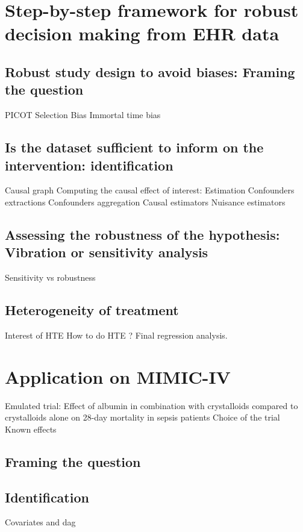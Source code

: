 \documentclass{report}
\begin{document}
\section{Step-by-step framework for robust decision making from EHR data}\label{sec:causal_tuto:framework}

\subsection{Robust study design to avoid biases: Framing the question}
PICOT
Selection Bias
Immortal time bias

\subsection{Is the dataset sufficient to inform on the intervention: identification}
Causal graph Computing the causal effect of interest: Estimation Confounders
extractions Confounders aggregation Causal estimators Nuisance estimators
\subsection{Assessing the robustness of the hypothesis: Vibration or sensitivity
  analysis}\label{subsec:causal_tuto:vibration_analysis}

Sensitivity vs robustness

\subsection{Heterogeneity of treatment}
Interest of HTE
How to do HTE ? Final regression analysis.

\section{Application on MIMIC-IV}\label{sec:causal_tuto:application}

Emulated trial: Effect of albumin in combination with crystalloids compared to crystalloids alone on 28-day mortality in sepsis patients
Choice of the trial
Known effects

\subsection{Framing the question}\label{subsec:causal_tuto:framing_mimic}
\subsection{Identification}
Covariates and dag
\end{document}
